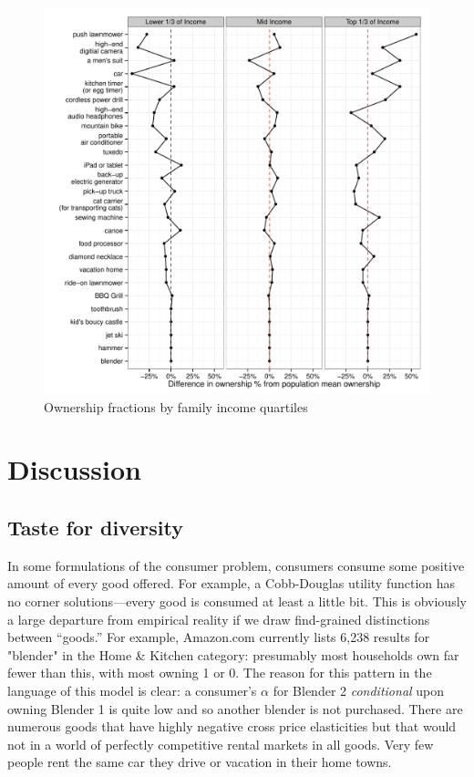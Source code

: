 \documentclass[11pt]{article}
\begin{document}
\begin{figure}
\centering 
\caption{Ownership fractions by family income quartiles}
\begin{minipage}{0.90 \linewidth}
\includegraphics[width = \linewidth]{./plots/ownership_fractions_inc.pdf} 
\end{minipage} 
\end{figure} 

\section{Discussion} 
 
\subsection{Taste for diversity} 
In some formulations of the consumer problem, consumers consume some positive amount of every good offered.
For example, a Cobb-Douglas utility function has no corner solutions---every good is consumed at least a little bit.
This is obviously a large departure from empirical reality if we draw find-grained distinctions between ``goods.'' 
For example, Amazon.com currently lists 6,238 results for "blender" in the Home \& Kitchen category: 
presumably most households own far fewer than this, with most owning 1 or 0.
The reason for this pattern in the language of this model is clear: 
a consumer's $\alpha$ for Blender 2 \emph{conditional} upon owning Blender 1 is quite low and so another blender is not purchased.   
There are numerous goods that have highly negative cross price elasticities but that would not in a world of perfectly competitive rental markets in all goods.  
Very few people rent the same car they drive or vacation in their home towns. 
   
\end{document}
